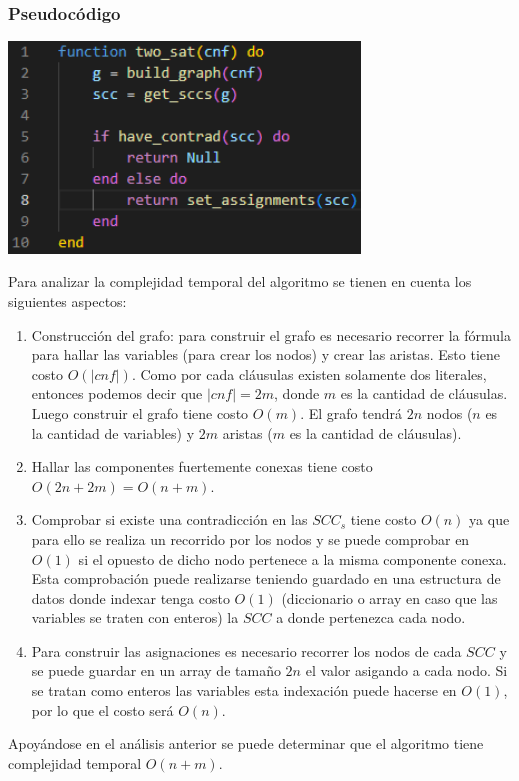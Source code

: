 \documentclass{article}
\begin{document}
        \subsubsection*{Pseudocódigo}
            \includegraphics[width = 0.7\textwidth]{resources/code4.png}

            Para analizar la complejidad temporal del algoritmo se tienen en cuenta los siguientes aspectos:
            \begin{enumerate}
                \item Construcción del grafo: para construir el grafo es necesario recorrer la fórmula para hallar las variables
                (para crear los nodos) y crear las aristas. Esto tiene costo $O(|cnf|)$. Como por cada cláusulas existen solamente dos
                literales, entonces podemos decir que $|cnf| =  2m$, donde $m$ es la cantidad de cláusulas. Luego construir el grafo tiene costo
                $O(m)$. El grafo tendrá $2n$ nodos ($n$ es la cantidad de variables) y $2m$ aristas ($m$ es la cantidad de cláusulas).
                \item Hallar las componentes fuertemente conexas tiene costo $O(2n+2m) = O(n+m)$.
                \item Comprobar si existe una contradicción en las $SCC_s$ tiene costo $O(n)$ ya que para ello se realiza un recorrido por 
                los nodos y se puede comprobar en $O(1)$ si el opuesto de dicho nodo pertenece a la misma componente conexa. Esta comprobación 
                puede realizarse teniendo guardado en una estructura de datos donde indexar tenga costo $O(1)$ (diccionario o  array en caso que 
                las variables se traten con enteros) la $SCC$ a donde pertenezca cada nodo.
                \item Para construir las asignaciones es necesario recorrer los nodos de cada $SCC$ y se puede guardar en un array de tamaño $2n$
                el valor asigando a cada nodo. Si se tratan como enteros las variables esta indexación puede hacerse en $O(1)$, por lo que el costo 
                será $O(n)$.
            \end{enumerate} 
            Apoyándose en el análisis anterior se puede determinar que el algoritmo tiene complejidad temporal $O(n+m)$.           
\end{document}
